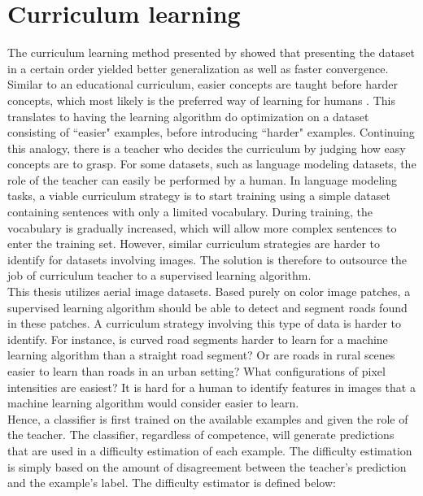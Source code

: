 \section{Curriculum learning}
\label{sec:curriculum_Learning}
The curriculum learning method presented by \cite{Bengio_curriculumlearning} showed that presenting the dataset in a certain order yielded better generalization as well as faster convergence. Similar to an educational curriculum, easier concepts are taught before harder concepts, which most likely is the preferred way of learning for humans \citep{Khan_human_teach}. This translates to having the learning algorithm do optimization on a dataset consisting of ``easier" examples, before introducing ``harder" examples. Continuing this analogy, there is a teacher who decides the curriculum by judging how easy concepts are to grasp. For some datasets, such as language modeling datasets, the role of the teacher can easily be performed by a human. In language modeling tasks, a viable curriculum strategy is to start training using a simple dataset containing sentences with only a limited vocabulary. During training, the vocabulary is gradually increased, which will allow more complex sentences to enter the training set. However, similar curriculum strategies are harder to identify for  datasets involving images. The solution is therefore to outsource the job of curriculum teacher to a supervised learning algorithm.  \\

This thesis utilizes aerial image datasets. Based purely on color image patches, a supervised learning algorithm should be able to detect and segment roads found in these patches. A curriculum strategy involving this type of data is harder to identify. For instance, is  curved road segments harder to learn for a machine learning algorithm than a straight road segment? Or are roads in rural scenes easier to learn than roads in an urban setting? What configurations of pixel intensities are easiest? It is hard for a human to identify features in images that a machine learning algorithm would consider easier to learn. \\


Hence, a classifier is first trained on the available examples and given the role of the teacher. The classifier, regardless of competence, will generate predictions that are used in a difficulty estimation of each example. The difficulty estimation is simply based on the amount of disagreement between the teacher's prediction and the example's label. The difficulty estimator is defined below:  \\

